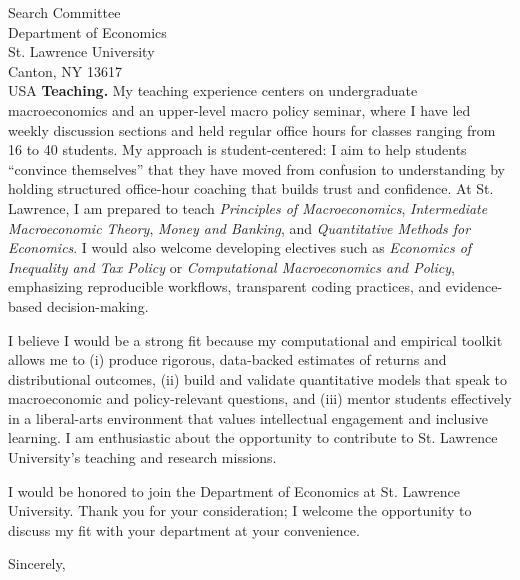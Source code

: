 \documentclass[11pt,letterpaper]{letter}
\begin{document}
\begin{letter}{Search Committee \\
Department of Economics \\
St. Lawrence University \\
Canton, NY 13617 \\ USA}
\textbf{Teaching.} My teaching experience centers on undergraduate macroeconomics and an upper-level macro policy seminar, where I have led weekly discussion sections and held regular office hours for classes ranging from 16 to 40 students. My approach is student-centered: I aim to help students “convince themselves” that they have moved from confusion to understanding by holding structured office-hour coaching that builds trust and confidence. At St. Lawrence, I am prepared to teach \textit{Principles of Macroeconomics}, \textit{Intermediate Macroeconomic Theory}, \textit{Money and Banking}, and \textit{Quantitative Methods for Economics}. I would also welcome developing electives such as \textit{Economics of Inequality and Tax Policy} or \textit{Computational Macroeconomics and Policy}, emphasizing reproducible workflows, transparent coding practices, and evidence-based decision-making.

I believe I would be a strong fit because my computational and empirical toolkit allows me to (i) produce rigorous, data-backed estimates of returns and distributional outcomes, (ii) build and validate quantitative models that speak to macroeconomic and policy-relevant questions, and (iii) mentor students effectively in a liberal-arts environment that values intellectual engagement and inclusive learning. I am enthusiastic about the opportunity to contribute to St. Lawrence University’s teaching and research missions.

I would be honored to join the Department of Economics at St. Lawrence University. Thank you for your consideration; I welcome the opportunity to discuss my fit with your department at your convenience.

\closing{Sincerely,}

\end{letter}
\end{document}
